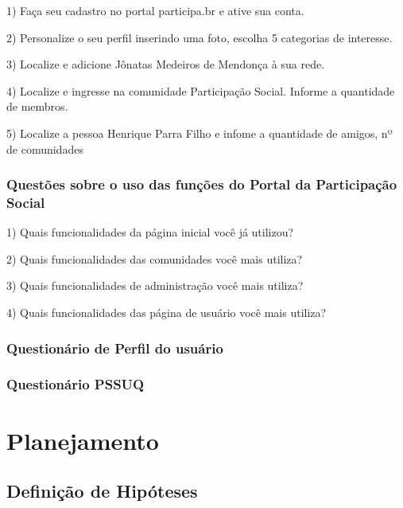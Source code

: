 1) Faça seu cadastro no portal participa.br e ative sua conta.

2) Personalize o seu perfil inserindo uma foto, escolha 5 categorias de interesse.

3) Localize e adicione Jônatas Medeiros de Mendonça à sua rede.

4) Localize e ingresse na comunidade Participação Social. Informe a quantidade de membros.

5) Localize a pessoa Henrique Parra Filho e infome a quantidade de amigos, nº de comunidades 

\subsubsection{Questões sobre o uso das funções do Portal da Participação Social}

1) Quais funcionalidades da página inicial você já utilizou?

2) Quais funcionalidades das comunidades você mais utiliza? 

3) Quais funcionalidades de administração você mais utiliza?

4) Quais funcionalidades das página de usuário você mais utiliza? 


\subsubsection{Questionário de Perfil do usuário}


\subsubsection{Questionário PSSUQ}


\section{Planejamento}

\subsection{Definição de Hipóteses}

